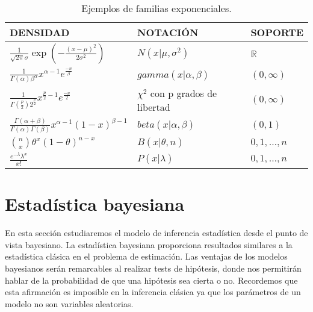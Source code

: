 \documentclass{article}
\newcommand{\importsection}[1]{}           %
\begin{document}
    \begin{table}[H]
    	\begin{center}
    		\begin{tabular}{|l|l|l|}
    			\hline
    			DENSIDAD & NOTACIÓN & SOPORTE\\
    			\hline \hline
                $\frac{1}{\sqrt{2 \pi} \sigma} \exp\left(- \frac{(x-\mu)^2}{2\sigma^2}\right)$ & $N(x|\mu, \sigma^2)$ & $\mathbb{R}$ \\
                \hline
                $\frac{1}{\Gamma(\alpha)\beta^\alpha}x^{\alpha - 1}e^{\frac{-x}{\beta}}$ & $ gamma(x|\alpha,\beta)$ &   $(0,\infty)  $\\ \hline
    			$\frac{1}{\Gamma(\frac{p}{2})2^{\frac{p}{2}}}x^{\frac{p}{2} - 1}e^{\frac{-x}{2}}$ & $\chi^2$ con p grados de libertad  & $(0,\infty)  $ \\ \hline
    			$\frac{\Gamma(\alpha + \beta)}{\Gamma(\alpha) \Gamma(\beta)} x ^{\alpha - 1}(1-x)^{\beta - 1}$ &  $beta(x| \alpha, \beta)$   &   $(0,1)$   \\ \hline
    			$\binom{n}{x} \theta ^x (1-\theta)^{n-x}$ &  $B(x|\theta, n)$ & ${0,1, \ldots , n}$   \\ \hline
    			$\frac{e^{-\lambda} \lambda^x}{x!}$ & $P(x|\lambda)$ & ${0,1, \ldots , n}$   \\ \hline
    		\end{tabular}
    	\end{center}
        \caption{Ejemplos de familias exponenciales.}
        \label{table:exponencial}
    \end{table}

\pagebreak
\importsection{Hipotesis.tex}

\pagebreak

\section{Estadística bayesiana} \label{sec:bayes}

En esta sección estudiaremos el modelo de inferencia estadística desde el punto de vista bayesiano. La estadística bayesiana proporciona resultados similares a la estadística clásica en el problema de estimación. Las ventajas de los modelos bayesianos serán remarcables al realizar tests de hipótesis, donde nos permitirán hablar de la probabilidad de que una hipótesis sea cierta o no. Recordemos que esta afirmación es imposible en la inferencia clásica ya que los parámetros de un modelo no son variables aleatorias.
\end{document}

